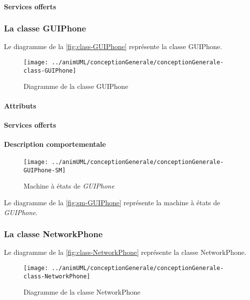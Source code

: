 \paragraph{Services offerts}
\classUserOperations
\subsubsection{La classe GUIPhone}

Le diagramme de la \autoref{fig:class-GUIPhone} représente la classe GUIPhone.
\begin{figure}[H]
	\centering
	\texttt{[image: ../animUML/conceptionGenerale/conceptionGenerale-class-GUIPhone]}
	\caption{Diagramme de la classe GUIPhone}
	\label{fig:class-GUIPhone}
\end{figure}


\paragraph{Attributs}
\classGUIPhoneProperties
\paragraph{Services offerts}
\classGUIPhoneOperations
\paragraph{Description comportementale}
\begin{figure}[H]
	\centering
	\texttt{[image: ../animUML/conceptionGenerale/conceptionGenerale-GUIPhone-SM]}
	\caption{Machine à états de \emph{GUIPhone}}
	\label{fig:sm-GUIPhone}
\end{figure}
Le diagramme de la \autoref{fig:sm-GUIPhone} représente la machine à états de \emph{GUIPhone}.

\subsubsection{La classe NetworkPhone}

Le diagramme de la \autoref{fig:class-NetworkPhone} représente la classe NetworkPhone.
\begin{figure}[H]
	\centering
	\texttt{[image: ../animUML/conceptionGenerale/conceptionGenerale-class-NetworkPhone]}
	\caption{Diagramme de la classe NetworkPhone}
	\label{fig:class-NetworkPhone}
\end{figure}


